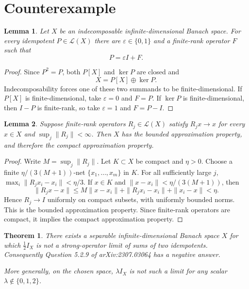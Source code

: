 \documentclass[11pt]{article}
\newtheorem{theorem}{Theorem}
\newtheorem{lemma}{Lemma}
\newcommand{\Lop}{\mathcal L}
\newcommand{\I}{I}
\begin{document}
\section*{Counterexample}

\begin{lemma}\label{lem:idempotent}
Let $X$ be an indecomposable infinite-dimensional Banach space.  For every
idempotent $P\in\Lop(X)$ there are $\varepsilon\in\{0,1\}$ and a finite-rank
operator $F$ such that
\[
P=\varepsilon\I+F.
\]
\end{lemma}

\begin{proof}
Since $P^2=P$, both $P[X]$ and $\ker P$ are closed and
\[
X=P[X]\oplus\ker P.
\]
Indecomposability forces one of these two summands to be finite-dimensional.
If $P[X]$ is finite-dimensional, take $\varepsilon=0$ and $F=P$.
If $\ker P$ is finite-dimensional, then $\I-P$ is finite-rank, so take
$\varepsilon=1$ and $F=P-\I$.
\end{proof}

\begin{lemma}\label{lem:bap}
Suppose finite-rank operators $R_j\in\Lop(X)$ satisfy
$R_jx\to x$ for every $x\in X$ and $\sup_j\|R_j\|<\infty$.  Then $X$ has
the bounded approximation property, and therefore the compact approximation
property.
\end{lemma}

\begin{proof}
Write $M=\sup_j\|R_j\|$.  Let $K\subset X$ be compact and $\eta>0$.
Choose a finite $\eta/(3(M+1))$-net $\{x_1,\ldots,x_m\}$ in $K$.
For all sufficiently large $j$,
$\max_i\|R_jx_i-x_i\|<\eta/3$.  If $x\in K$ and
$\|x-x_i\|<\eta/(3(M+1))$, then
\[
\|R_jx-x\|
 \le M\|x-x_i\|+\|R_jx_i-x_i\|+\|x_i-x\|<\eta.
\]
Hence $R_j\to\I$ uniformly on compact subsets, with uniformly bounded norms.
This is the bounded approximation property.  Since finite-rank operators are
compact, it implies the compact approximation property.
\end{proof}

\begin{theorem}\label{thm:main}
There exists a separable infinite-dimensional Banach space $X$ for which
$\tfrac12\I_X$ is not a strong-operator limit of sums of two idempotents.
Consequently Question 5.2.9 of arXiv:2307.03064 has a negative answer.

More generally, on the chosen space, $\lambda\I_X$ is not such a limit for
any scalar $\lambda\notin\{0,1,2\}$.
\end{theorem}
\end{document}
